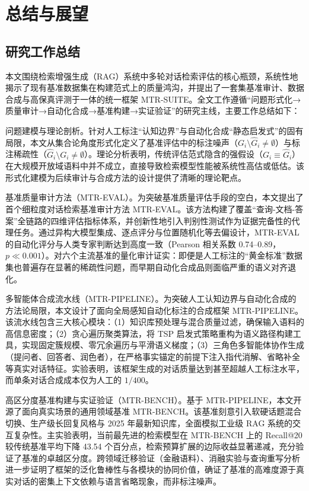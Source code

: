 \chapter{总结与展望}
\label{chap:conclusion}

\section{研究工作总结}
\label{sec:summary}

本文围绕检索增强生成（RAG）系统中多轮对话检索评估的核心瓶颈，系统性地揭示了现有基准数据集在构建范式上的质量鸿沟，并提出了一套集基准审计、数据合成与高保真评测于一体的统一框架 MTR-SUITE。全文工作遵循“问题形式化→质量审计→自动化合成→基准构建→实证验证”的研究主线，主要工作总结如下：

问题建模与理论剖析。针对人工标注“认知边界”与自动化合成“静态启发式”的固有局限，本文从集合论角度形式化定义了基准评估中的标注噪声（$G_i \setminus \hat{G}_i \neq \emptyset$）与标注稀疏性（$\hat{G}_i \setminus G_i \neq \emptyset$）。理论分析表明，传统评估范式隐含的强假设（$G_i \equiv \hat{G}_i$）在大规模开放域语料中并不成立，直接导致检索模型性能被系统性高估或低估。该形式化建模为后续审计与合成方法的设计提供了清晰的理论靶点。

基准质量审计方法（MTR-EVAL）。为突破基准质量评估手段的空白，本文提出了首个细粒度对话检索基准审计方法 MTR-EVAL。该方法构建了覆盖“查询-文档-答案”全链路的四维评估指标体系，并创新性地引入判别性测试作为证据完备性的代理任务。通过异构大模型集成、逐点评分与位置随机化等去偏设计，MTR-EVAL 的自动化评分与人类专家判断达到高度一致（Pearson 相关系数 0.74--0.89，$p \ll 0.001$）。对六个主流基准的量化审计证实：即便是人工标注的“黄金标准”数据集也普遍存在显著的稀疏性问题，而早期自动化合成品则面临严重的语义对齐退化。

多智能体合成流水线（MTR-PIPELINE）。为突破人工认知边界与自动化合成的方法论局限，本文设计了面向全局感知自动化标注的合成框架 MTR-PIPELINE。该流水线包含三大核心模块：（1）知识库预处理与混合质量过滤，确保输入语料的高信息密度；（2）贪心遍历聚类算法，将 TSP 启发式策略重构为语义路径构建工具，实现固定簇规模、零冗余遍历与平滑语义梯度；（3）三角色多智能体协作生成（提问者、回答者、润色者），在严格事实锚定的前提下注入指代消解、省略补全等真实对话特征。实验表明，该框架生成的对话质量达到甚至超越人工标注水平，而单条对话合成成本仅为人工的 $1/400$。

高区分度基准构建与实证验证（MTR-BENCH）。基于 MTR-PIPELINE，本文开源了面向真实场景的通用领域基准 MTR-BENCH。该基准刻意引入软硬话题混合切换、生产级长回复风格与 2025 年最新知识库，全面模拟工业级 RAG 系统的交互复杂性。主实验表明，当前最先进的检索模型在 MTR-BENCH 上的 Recall@20 较传统基准平均下降 43.54 个百分点，检索预算扩展的边际收益显著递减，充分验证了基准的卓越区分度。跨领域迁移验证（金融语料）、消融实验与查询重写分析进一步证明了框架的泛化鲁棒性与各模块的协同价值，确证了基准的高难度源于真实对话的密集上下文依赖与语言省略现象，而非标注噪声。

